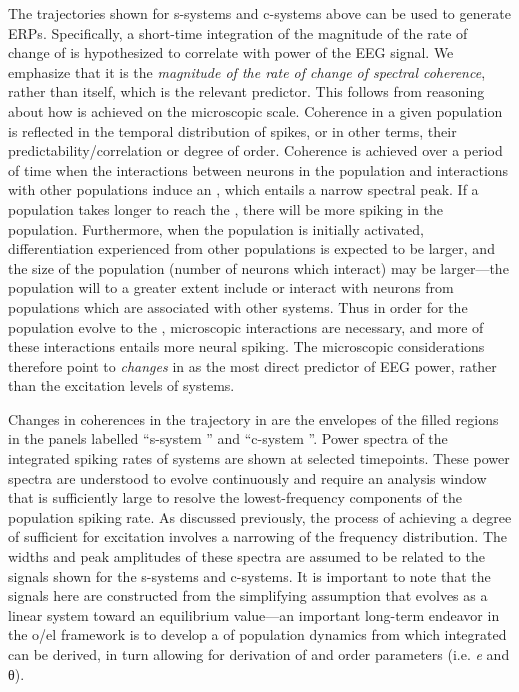   The  trajectories shown for s-systems and c-systems above can be used to generate ERPs. Specifically, a short-time integration of the magnitude of the rate of change of  is hypothesized to correlate with power of the EEG signal. We emphasize that it is the \textit{magnitude of the rate of change of spectral coherence}, rather than  itself, which is the relevant predictor. This follows from reasoning about how  is achieved on the microscopic scale. Coherence in a given population is reflected in the temporal distribution of spikes, or in other terms, their predictability/correlation or degree of order. Coherence is achieved over a period of time when the interactions between neurons in the population and interactions with other populations induce an , which entails a narrow spectral peak. If a population takes longer to reach the , there will be more spiking in the population. Furthermore, when the population is initially activated, differentiation  experienced from other populations is expected to be larger, and the size of the population (number of neurons which interact) may be larger—the population will to a greater extent include or interact with neurons from populations which are associated with other systems. Thus in order for the population evolve to the , microscopic interactions are necessary, and more of these interactions entails more neural spiking. The microscopic considerations therefore point to \textit{changes} in  as the most direct predictor of EEG power, rather than the excitation levels of systems. 

Changes in coherences in the trajectory in {} are the envelopes of the filled regions in the panels labelled “s-system ” and “c-system ”. Power spectra of the integrated spiking rates of systems are shown at selected timepoints. These power spectra are understood to evolve continuously and require an analysis window that is sufficiently large to resolve the lowest-frequency components of the population spiking rate. As discussed previously, the process of achieving a degree of  sufficient for excitation involves a narrowing of the frequency distribution. The widths and peak amplitudes of these spectra are assumed to be related to the  signals shown for the s-systems and c-systems. It is important to note that the  signals here are constructed from the simplifying assumption that  evolves as a linear system toward an equilibrium value—an important long-term endeavor in the o/el framework is to develop a  of population dynamics from which integrated  can be derived, in turn allowing for derivation of  and order parameters (i.e. \textit{e} and θ). 

